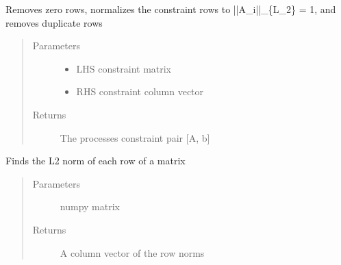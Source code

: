 \documentclass[letterpaper,10pt,english]{sphinxmanual}
\begin{document}
\begin{fulllineitems}
\label{\detokenize{ppopt.utils:ppopt.utils.constraint_utilities.cheap_remove_redundant_constraints}}
\sphinxAtStartPar
Removes zero rows, normalizes the constraint rows to ||A\_i||\_\{L\_2\} = 1, and removes duplicate rows
\begin{quote}\begin{description}
\item[{Parameters}] \leavevmode\begin{itemize}
\item {} 
\sphinxAtStartPar
{} \textendash{} LHS constraint matrix

\item {} 
\sphinxAtStartPar
{} \textendash{} RHS constraint column vector

\end{itemize}

\item[{Returns}] \leavevmode
\sphinxAtStartPar
The processes constraint pair {[}A, b{]}

\end{description}\end{quote}

\end{fulllineitems}


\begin{fulllineitems}
\label{\detokenize{ppopt.utils:ppopt.utils.constraint_utilities.constraint_norm}}
\sphinxAtStartPar
Finds the L2 norm of each row of a matrix
\begin{quote}\begin{description}
\item[{Parameters}] \leavevmode
\sphinxAtStartPar
{} \textendash{} numpy matrix

\item[{Returns}] \leavevmode
\sphinxAtStartPar
A column vector of the row norms

\end{description}\end{quote}

\end{fulllineitems}
\end{document}
